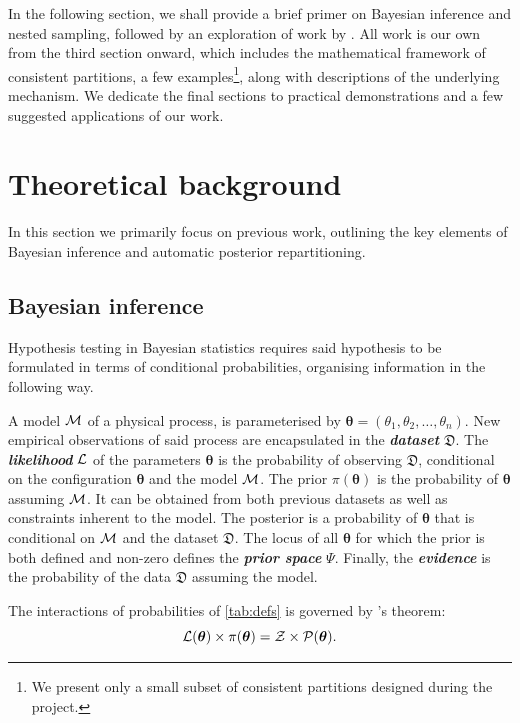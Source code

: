 \documentclass[usenatbib]{mnras}
\begin{document}
In the following section, we shall provide a brief primer on Bayesian
inference and nested sampling, followed by an exploration of work by
\cite{chen-ferroz-hobson}. All work is our own from the third section
onward, which includes the mathematical framework of consistent
partitions, a few examples\footnote{We present only a small subset of
  consistent partitions designed during the project. }, along with
descriptions of the underlying mechanism. We dedicate the final
sections to practical demonstrations and a few suggested applications
of our work.

\section{Theoretical background}\label{sec:orge6061a4}
In this section we primarily focus on previous work, outlining the key
elements of Bayesian inference \citep{jeffreys2010scientific} and
automatic posterior repartitioning. 
\subsection{Bayesian inference}\label{sec:primer}

Hypothesis testing in Bayesian statistics requires said hypothesis to
be formulated in terms of conditional probabilities, organising
information in the following way.

A model \({\cal M}\) of a physical process, is parameterised by
\(\bm{\theta} = (\theta_{1}, \theta_{2}, \ldots , \theta_{n})\).  New
empirical observations of said process are encapsulated in the
\textbf{\emph{dataset}} \(\mathfrak{D}\).  The
\emph{\textbf{likelihood}} ${\cal L}$ of the parameters $\bm{\theta}$
is the probability of observing \(\mathfrak{D}\), conditional on the
configuration $\bm{\theta}$ and the model ${\cal M}$.  The prior
\(\pi(\bm{\theta})\) is the probability of $\bm{\theta}$ assuming
${\cal M}$. It can be obtained from both previous datasets as well as
constraints inherent to the model. The posterior is a probability of
$\bm{\theta}$ that is conditional on ${\cal M}$ and the dataset
${\mathfrak D}$. The locus of all $\bm{\theta}$ for which the prior is
both defined and non-zero defines the \textbf{\emph{prior space}}
$\Psi$. Finally, the \textbf{\emph{evidence}} is the probability of
the data \({\mathfrak D}\) assuming the model.

The interactions of probabilities of \cref{tab:defs} is governed by
\citeauthor{1763}'s theorem:
\begin{equation}\label{eq:bayes} 
 {\cal L}(\bm{\theta}) \times \pi (\bm{\theta}) = {\cal Z} \times {\cal P} (\bm{\theta}).  
\end{equation}
\end{document}
